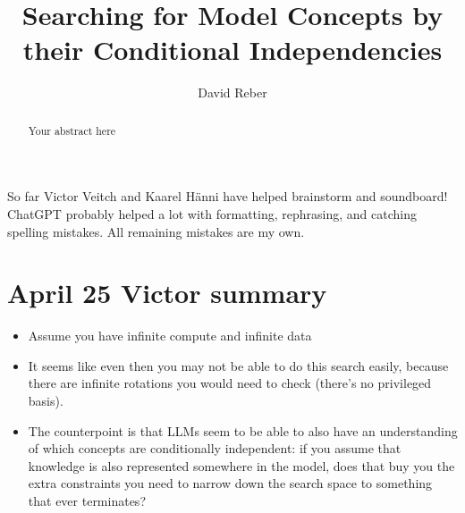 \documentclass{article}
\title{Searching for Model Concepts by their Conditional Independencies}
\date{}
\author[1]{David Reber}
\begin{document}
\maketitle

\begin{abstract}
Your abstract here
\end{abstract}

So far Victor Veitch and Kaarel Hänni have helped brainstorm and soundboard! ChatGPT probably helped a lot with formatting, rephrasing, and catching spelling mistakes. All remaining mistakes are my own.

\section{April 25 Victor summary}
\begin{itemize}
    \item Assume you have infinite compute and infinite data
    \item It seems like even then you may not be able to do this search easily, because there are infinite rotations you would need to check (there's no privileged basis).
    \item The counterpoint is that LLMs seem to be able to also have an understanding of which concepts are conditionally independent: if you assume that knowledge is also represented somewhere in the model, does that buy you the extra constraints you need to narrow down the search space to something that ever terminates?
\end{itemize}
\end{document}
